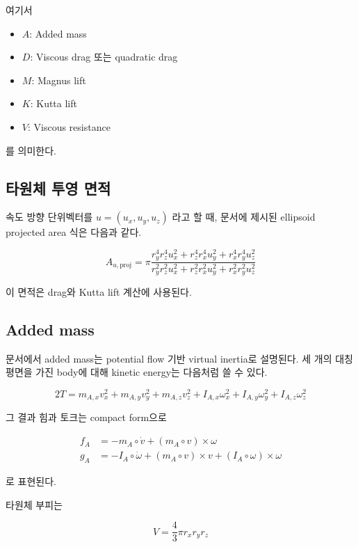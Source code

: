 \documentclass[11pt,a4paper]{article}
\begin{document}
여기서

\begin{itemize}[leftmargin=2em]
  \item $A$: Added mass
  \item $D$: Viscous drag 또는 quadratic drag
  \item $M$: Magnus lift
  \item $K$: Kutta lift
  \item $V$: Viscous resistance
\end{itemize}

를 의미한다.

\subsection{타원체 투영 면적}

속도 방향 단위벡터를 $u=(u_x,u_y,u_z)$ 라고 할 때, 문서에 제시된 ellipsoid projected area 식은 다음과 같다.

\begin{equation}
A_{u,\text{proj}}
=
\pi
\frac{
r_y^4 r_z^4 u_x^2 + r_z^4 r_x^4 u_y^2 + r_x^4 r_y^4 u_z^2
}{
r_y^2 r_z^2 u_x^2 + r_z^2 r_x^2 u_y^2 + r_x^2 r_y^2 u_z^2
}
\end{equation}

이 면적은 drag와 Kutta lift 계산에 사용된다.

\subsection{Added mass}

문서에서 added mass는 potential flow 기반 virtual inertia로 설명된다. 세 개의 대칭 평면을 가진 body에 대해 kinetic energy는 다음처럼 쓸 수 있다.

\begin{equation}
2T
=
m_{A,x}v_x^2 + m_{A,y}v_y^2 + m_{A,z}v_z^2
+ I_{A,x}\omega_x^2 + I_{A,y}\omega_y^2 + I_{A,z}\omega_z^2
\end{equation}

그 결과 힘과 토크는 compact form으로

\begin{align}
f_A &= -m_A \circ \dot{v} + (m_A \circ v)\times \omega \\
g_A &= -I_A \circ \dot{\omega} + (m_A \circ v)\times v + (I_A \circ \omega)\times \omega
\end{align}

로 표현된다.

타원체 부피는

\begin{equation}
V = \frac{4}{3}\pi r_x r_y r_z
\end{equation}
\end{document}
